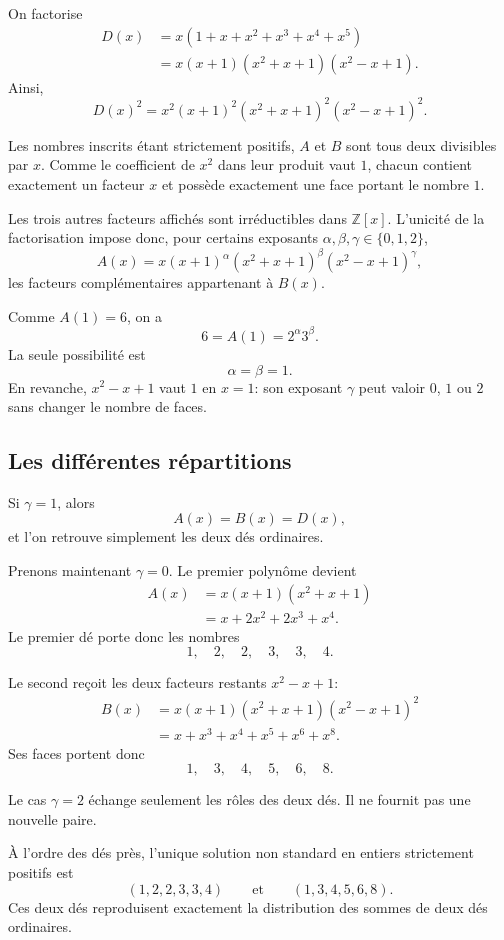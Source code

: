 \documentclass[11pt,a4paper]{article}
\begin{document}
On factorise
\[
\begin{aligned}
D(x)
&=x(1+x+x^2+x^3+x^4+x^5)\\
&=x(x+1)(x^2+x+1)(x^2-x+1).
\end{aligned}
\]
Ainsi,
\[
D(x)^2
=x^2(x+1)^2(x^2+x+1)^2(x^2-x+1)^2.
\]

Les nombres inscrits étant strictement positifs, $A$ et $B$ sont tous deux
divisibles par $x$. Comme le coefficient de $x^2$ dans leur produit vaut $1$,
chacun contient exactement un facteur $x$ et possède exactement une face
portant le nombre $1$.

Les trois autres facteurs affichés sont irréductibles dans $\mathbb Z[x]$.
L'unicité de la factorisation impose donc, pour certains exposants
$\alpha,\beta,\gamma\in\{0,1,2\}$,
\[
A(x)=x(x+1)^\alpha(x^2+x+1)^\beta(x^2-x+1)^\gamma,
\]
les facteurs complémentaires appartenant à $B(x)$.

Comme $A(1)=6$, on a
\[
6=A(1)=2^\alpha3^\beta.
\]
La seule possibilité est
\[
\alpha=\beta=1.
\]
En revanche, $x^2-x+1$ vaut $1$ en $x=1$: son exposant $\gamma$ peut valoir
$0$, $1$ ou $2$ sans changer le nombre de faces.

\subsection*{Les différentes répartitions}

Si $\gamma=1$, alors
\[
A(x)=B(x)=D(x),
\]
et l'on retrouve simplement les deux dés ordinaires.

Prenons maintenant $\gamma=0$. Le premier polynôme devient
\[
\begin{aligned}
A(x)
&=x(x+1)(x^2+x+1)\\
&=x+2x^2+2x^3+x^4.
\end{aligned}
\]
Le premier dé porte donc les nombres
\[
1,\quad2,\quad2,\quad3,\quad3,\quad4.
\]

Le second reçoit les deux facteurs restants $x^2-x+1$:
\[
\begin{aligned}
B(x)
&=x(x+1)(x^2+x+1)(x^2-x+1)^2\\
&=x+x^3+x^4+x^5+x^6+x^8.
\end{aligned}
\]
Ses faces portent donc
\[
1,\quad3,\quad4,\quad5,\quad6,\quad8.
\]

Le cas $\gamma=2$ échange seulement les rôles des deux dés. Il ne fournit pas
une nouvelle paire.

\begin{resultbox}
À l'ordre des dés près, l'unique solution non standard en entiers strictement
positifs est
\[
\boxed{(1,2,2,3,3,4)}
\qquad\text{et}\qquad
\boxed{(1,3,4,5,6,8)}.
\]
Ces deux dés reproduisent exactement la distribution des sommes de deux dés
ordinaires.
\end{resultbox}
\end{document}
